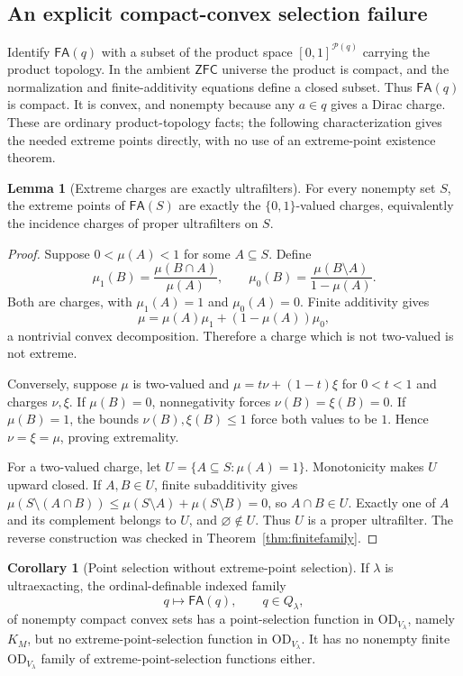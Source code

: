 \documentclass[11pt,letterpaper]{article}
\theoremstyle{definition}
\newtheorem{lemma}[definition]{Lemma}
\newtheorem{corollary}[definition]{Corollary}
\newcommand{\ZFC}{\mathsf{ZFC}}
\newcommand{\OD}{\mathrm{OD}}
\newcommand{\FA}{\mathsf{FA}}
\newcommand{\Pow}{\mathcal P}
\newcommand{\ODlam}{\OD_{V_\lambda}}
\newcommand{\Qlam}{Q_\lambda}
\begin{document}
\subsection{An explicit compact-convex selection failure}

Identify $\FA(q)$ with a subset of the product space $[0,1]^{\Pow(q)}$ carrying the product topology. In the ambient $\ZFC$ universe the product is compact, and the normalization and finite-additivity equations define a closed subset. Thus $\FA(q)$ is compact. It is convex, and nonempty because any $a\in q$ gives a Dirac charge. These are ordinary product-topology facts; the following characterization gives the needed extreme points directly, with no use of an extreme-point existence theorem.

\begin{lemma}[Extreme charges are exactly ultrafilters]\label{lem:extreme}
For every nonempty set $S$, the extreme points of $\FA(S)$ are exactly the $\{0,1\}$-valued charges, equivalently the incidence charges of proper ultrafilters on $S$.
\end{lemma}

\begin{proof}
Suppose $0<\mu(A)<1$ for some $A\subseteq S$. Define
\[
 \mu_1(B)=\frac{\mu(B\cap A)}{\mu(A)},
 \qquad
 \mu_0(B)=\frac{\mu(B\setminus A)}{1-\mu(A)}.
\]
Both are charges, with $\mu_1(A)=1$ and $\mu_0(A)=0$. Finite additivity gives
\[
 \mu=\mu(A)\mu_1+(1-\mu(A))\mu_0,
\]
a nontrivial convex decomposition. Therefore a charge which is not two-valued is not extreme.

Conversely, suppose $\mu$ is two-valued and $\mu=t\nu+(1-t)\xi$ for $0<t<1$ and charges $\nu,\xi$. If $\mu(B)=0$, nonnegativity forces $\nu(B)=\xi(B)=0$. If $\mu(B)=1$, the bounds $\nu(B),\xi(B)\le1$ force both values to be $1$. Hence $\nu=\xi=\mu$, proving extremality.

For a two-valued charge, let $U=\{A\subseteq S:\mu(A)=1\}$. Monotonicity makes $U$ upward closed. If $A,B\in U$, finite subadditivity gives $\mu(S\setminus(A\cap B))\le\mu(S\setminus A)+\mu(S\setminus B)=0$, so $A\cap B\in U$. Exactly one of $A$ and its complement belongs to $U$, and $\varnothing\notin U$. Thus $U$ is a proper ultrafilter. The reverse construction was checked in Theorem~\ref{thm:finitefamily}.
\end{proof}

\begin{corollary}[Point selection without extreme-point selection]\label{cor:convex}
If $\lambda$ is ultraexacting, the ordinal-definable indexed family
\[
 q\longmapsto\FA(q),\qquad q\in\Qlam,
\]
of nonempty compact convex sets has a point-selection function in $\ODlam$, namely $K_M$, but no extreme-point-selection function in $\ODlam$. It has no nonempty finite $\ODlam$ family of extreme-point-selection functions either.
\end{corollary}
\end{document}
